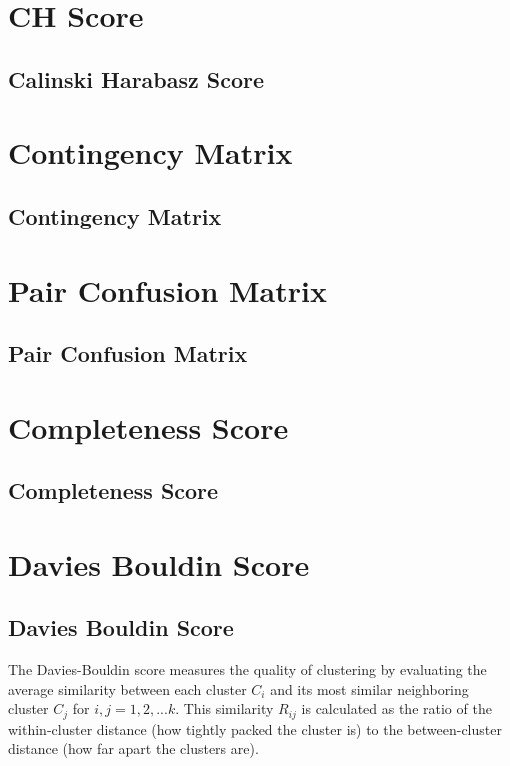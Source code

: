 \clearpage
\thispagestyle{clusteringstyle}
\section{CH Score}
\subsection{Calinski Harabasz Score}


\clearpage
\thispagestyle{clusteringstyle}
\section{Contingency Matrix}
\subsection{Contingency Matrix}

\clearpage
\thispagestyle{clusteringstyle}
\section{Pair Confusion Matrix}
\subsection{Pair Confusion Matrix}

\clearpage
\thispagestyle{clusteringstyle}
\section{Completeness Score}
\subsection{Completeness Score}

\clearpage
\thispagestyle{clusteringstyle}
\section{Davies Bouldin Score}
\subsection{Davies Bouldin Score}

The Davies-Bouldin score measures the quality of clustering by evaluating the average similarity between each cluster \( C_i \) and its most similar neighboring cluster 
\( C_j \) for $i,j = 1, 2, ... k$. This similarity \( R_{ij} \) is calculated as the ratio of the within-cluster distance (how tightly packed the cluster is) to the between-cluster distance (how far apart the clusters are).

